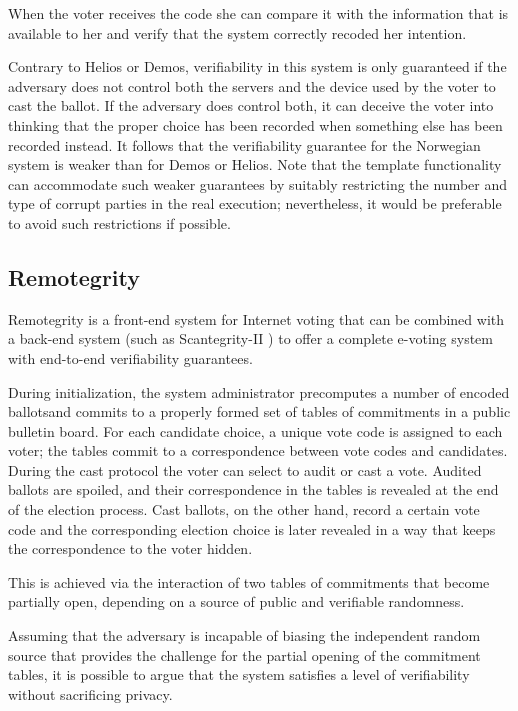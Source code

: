 When the voter receives the code she can compare it with the
information that is available to her and verify that the system
correctly recoded her intention.

Contrary to Helios or Demos, verifiability in this system is only
guaranteed if the adversary does not control both the servers and the
device used by the voter to cast the ballot. If the adversary does
control both, it can deceive the voter into thinking that the proper
choice has been recorded when something else has been recorded
instead. It follows that the verifiability guarantee for the Norwegian
system is weaker than for Demos or Helios. Note that the template
functionality can accommodate such weaker guarantees by suitably
restricting the number and type of corrupt parties in the real
execution; nevertheless, it would be preferable to avoid such
restrictions if possible.

\subsection{Remotegrity}

Remotegrity \cite{zagorski2013} is a front-end system for Internet
voting that can be combined with a back-end system (such as
Scantegrity-II \cite{chaum2008scantegrity}) to offer a complete
e-voting system with end-to-end verifiability guarantees.

During initialization, the system administrator precomputes a number
of encoded ballotsand commits to a properly formed set of tables of
commitments in a public bulletin board. For each candidate choice, a
unique vote code is assigned to each voter; the tables commit to a
correspondence between vote codes and candidates. During the cast
protocol the voter can select to audit or cast a vote. Audited ballots
are spoiled, and their correspondence in the tables is revealed at the
end of the election process. Cast ballots, on the other hand, record a
certain vote code and the corresponding election choice is later
revealed in a way that keeps the correspondence to the voter hidden.

This is achieved via the interaction of two tables of commitments that
become partially open, depending on a source of public and verifiable
randomness.

Assuming that the adversary is incapable of biasing the independent
random source that provides the challenge for the partial opening of
the commitment tables, it is possible to argue that the system
satisfies a level of verifiability without sacrificing privacy.

